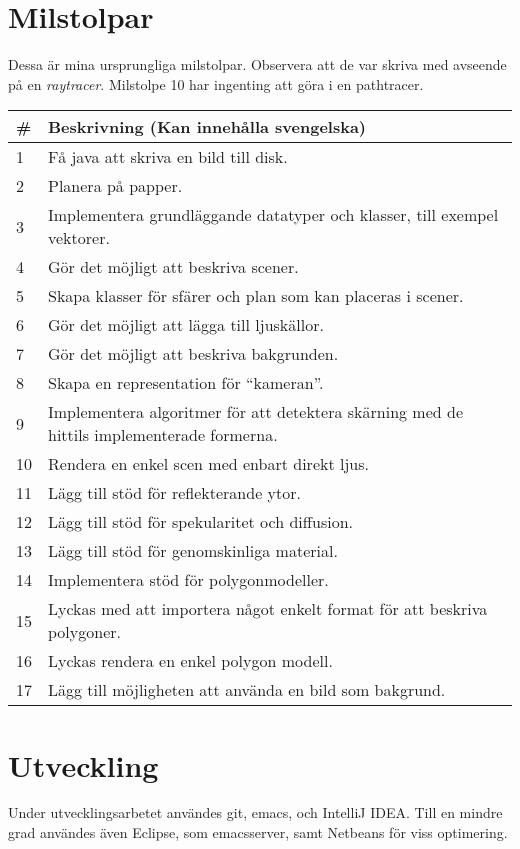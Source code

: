 \documentclass{article}
\begin{document}
\section{Milstolpar}
Dessa är mina ursprungliga milstolpar. Observera att de var skriva med
avseende på en \emph{raytracer}. Milstolpe 10 har ingenting att göra i
en pathtracer.

\begin{tabular}{|l|l|}
  \hline
\# & Beskrivning (Kan innehålla svengelska) \\
\hline
1 & Få java att skriva en bild till disk. \\
2 & Planera på papper. \\
3 & Implementera grundläggande datatyper och klasser, till exempel vektorer. \\
4 & Gör det möjligt att beskriva scener. \\
5 & Skapa klasser för sfärer och plan som kan placeras i scener. \\
6 & Gör det möjligt att lägga till ljuskällor. \\
7 & Gör det möjligt att beskriva bakgrunden. \\
8 & Skapa en representation för ``kameran''. \\
9 & Implementera algoritmer för att detektera skärning med de hittils implementerade formerna. \\
10 & Rendera en enkel scen med enbart direkt ljus. \\
11 & Lägg till stöd för reflekterande ytor. \\
12 & Lägg till stöd för spekularitet och diffusion. \\
13 & Lägg till stöd för genomskinliga material. \\
14 & Implementera stöd för polygonmodeller. \\
15 & Lyckas med att importera något enkelt format för att beskriva polygoner. \\
16 & Lyckas rendera en enkel polygon modell. \\
17 & Lägg till möjligheten att använda en bild som bakgrund. \\
\hline
\end{tabular}

\section{Utveckling}
Under utvecklingsarbetet användes git, emacs, och IntelliJ IDEA. Till
en mindre grad användes även Eclipse, som emacsserver, samt Netbeans
för viss optimering.
\end{document}
